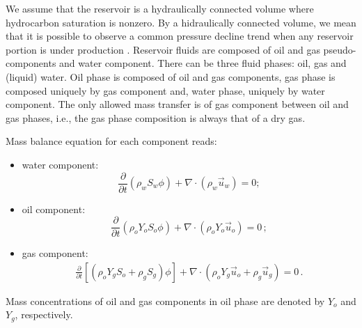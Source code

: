 \documentclass[authoryear,preprint,review,11pt]{elsarticle}
\begin{document}

We assume that the reservoir is a hydraulically connected volume where hydrocarbon saturation is nonzero. By a hidraulically connected volume, we mean that it is possible to observe a common pressure decline trend when any reservoir portion is under production \citep{dakepractice}. Reservoir fluids are composed of oil and gas pseudo-components and water component. There can be three fluid phases: oil, gas and (liquid) water. Oil phase is composed of oil and gas components, gas phase is composed uniquely by gas component and, water phase, uniquely by water component. The only allowed mass transfer is of gas component between oil and gas phases, i.e., the gas phase composition is always that of a dry gas.


Mass balance equation for each component reads:

\begin{itemize}
\item water component:
\begin{equation}\label{eq: Sw1}
\frac{\partial}{\partial t} \left( \rho_w S_w \phi \right) +\nabla \cdot \left( \rho_w \vec{u}_w \right) = 0 ;
\end{equation}

\item oil component:
\begin{equation}\label{eq: So1}
\frac{\partial}{\partial t}\left( \rho_o Y_o S_o \phi \right) + \nabla \cdot \left( \rho_o Y_o \vec{u}_o \right) = 0 \, ;
\end{equation}

\item gas component:
\begin{equation}\label{eq: Sg1}
\begin{split}
\frac{\partial}{\partial t} \left[\left( \rho_o Y_g S_o + \rho_g S_g\right)\phi \right] + \nabla  \cdot \left( \rho_o Y_g \vec{u}_o + \rho_g \vec{u}_g\right) = 0\, .
\end{split}
\end{equation}
\end{itemize}
Mass concentrations of oil and gas components in oil phase are denoted by $Y_o$ and $Y_g$, respectively. 
\end{document}
